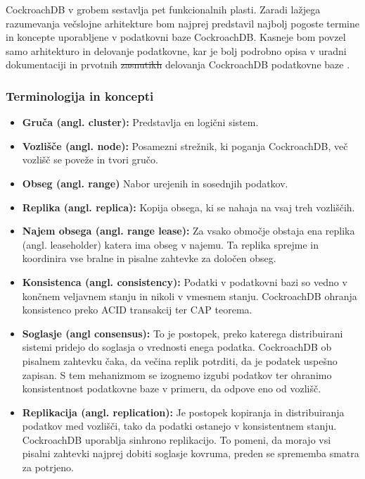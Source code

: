 \documentclass[a4paper, 12pt]{book}
\providecommand{\DIFaddtex}[1]{{\protect\color{blue}\uwave{#1}}} %
\providecommand{\DIFdeltex}[1]{{\protect\color{red}\sout{#1}}}                      %
\providecommand{\DIFaddbegin}{} %
\providecommand{\DIFaddend}{} %
\providecommand{\DIFdelbegin}{} %
\providecommand{\DIFdelend}{} %
\providecommand{\DIFadd}[1]{\texorpdfstring{\DIFaddtex{#1}}{#1}} %
\providecommand{\DIFdel}[1]{\texorpdfstring{\DIFdeltex{#1}}{}} %
\newcommand{\DIFscaledelfig}{0.5}
\newlength{\DIFdelgraphicswidth} %
\newlength{\DIFdelgraphicsheight} %
\newcommand{\DIFaddincludegraphics}[2][]{{\color{blue}\fbox{\DIFOincludegraphics[#1]{#2}}}} %
\newcommand{\DIFdelincludegraphics}[2][]{%
\sbox{\DIFdelgraphicsbox}{\DIFOincludegraphics[#1]{#2}}%
\settoboxwidth{\DIFdelgraphicswidth}{\DIFdelgraphicsbox} %
\settoboxtotalheight{\DIFdelgraphicsheight}{\DIFdelgraphicsbox} %
\scalebox{\DIFscaledelfig}{%
\parbox[b]{\DIFdelgraphicswidth}{\usebox{\DIFdelgraphicsbox}\\[-\baselineskip] \rule{\DIFdelgraphicswidth}{0em}}\llap{\resizebox{\DIFdelgraphicswidth}{\DIFdelgraphicsheight}{%
\setlength{\unitlength}{\DIFdelgraphicswidth}%
\begin{picture}(1,1)%
\thicklines\linethickness{2pt} %
{\color[rgb]{1,0,0}\put(0,0){\framebox(1,1){}}}%
{\color[rgb]{1,0,0}\put(0,0){\line( 1,1){1}}}%
{\color[rgb]{1,0,0}\put(0,1){\line(1,-1){1}}}%
\end{picture}%
}\hspace*{3pt}}} %
} %
\DeclareRobustCommand{\DIFaddbegin}{\DIFOaddbegin \let\includegraphics\DIFaddincludegraphics} %
\DeclareRobustCommand{\DIFaddend}{\DIFOaddend \let\includegraphics\DIFOincludegraphics} %
\DeclareRobustCommand{\DIFdelbegin}{\DIFOdelbegin \let\includegraphics\DIFdelincludegraphics} %
\DeclareRobustCommand{\DIFdelend}{\DIFOaddend \let\includegraphics\DIFOincludegraphics} %
\begin{document}
CockroachDB v grobem sestavlja pet funkcionalnih plasti. Zaradi lažjega razumevanja večslojne arhitekture bom najprej predstavil najbolj pogoste termine in koncepte uporabljene v podatkovni baze CockroachDB. Kasneje bom povzel samo arhitekturo in delovanje podatkovne, kar je bolj podrobno opisa v uradni dokumentaciji \cite{CRDB-home} in prvotnih \DIFdelbegin \DIFdel{zasnutikh }\DIFdelend \DIFaddbegin \DIFadd{zasnutkih }\DIFaddend delovanja CockroachDB podatkovne baze \cite{CRDB-design}.

\subsubsection{Terminologija in koncepti}

\begin{itemize}
    \item \textbf{Gruča (angl. cluster):} Predstavlja en logični sistem. 
    \item \textbf{Vozlišče (angl. node):} Posamezni strežnik, ki poganja CockroachDB, več vozlišč se poveže in tvori gručo.
    \item \textbf{Obseg (angl. range)} Nabor urejenih in sosednjih podatkov.
    \item \textbf{Replika (angl. replica):} Kopija obsega, ki se nahaja na vsaj treh vozliščih.
    \item \textbf{Najem obsega (angl. range lease):} Za vsako območje obstaja ena replika (angl. leaseholder) katera ima obseg v najemu. Ta replika sprejme in koordinira vse bralne in pisalne zahtevke za določen obseg.
    \item \textbf{Konsistenca (angl. consistency):} Podatki v podatkovni bazi so vedno v končnem veljavnem stanju in nikoli v vmesnem stanju. CockroachDB ohranja konsistenco preko ACID transakcij ter CAP teorema.
    \item \textbf{Soglasje (angl consensus):} To je postopek, preko katerega distribuirani sistemi pridejo do soglasja o vrednosti enega podatka. CockroachDB ob pisalnem zahtevku čaka, da večina replik potrditi, da je podatek uspešno zapisan. S tem mehanizmom se izognemo izgubi podatkov ter ohranimo konsistentnost podatkovne baze v primeru, da odpove eno od vozlišč.
    \item \textbf{Replikacija (angl. replication):} Je postopek kopiranja in distribuiranja podatkov med vozlišči, tako da podatki ostanejo v konsistentnem stanju. CockroachDB uporablja sinhrono replikacijo. To pomeni, da morajo vsi pisalni zahtevki najprej dobiti soglasje kovruma, preden se sprememba smatra za potrjeno.

\end{itemize}
\end{document}
